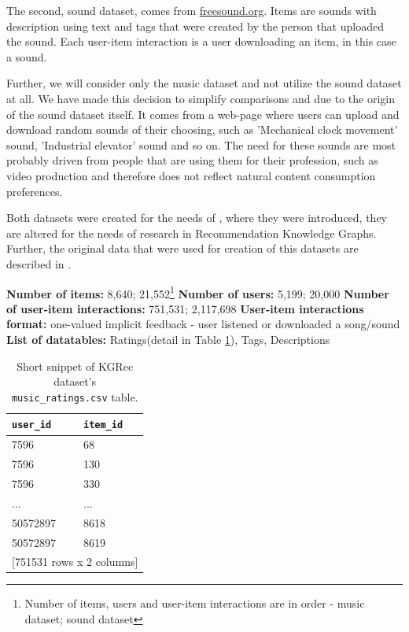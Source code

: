 The second, sound dataset, comes from \href{https://freesound.org/}{freesound.org}. Items are sounds with description using text and tags that were created by the person that uploaded the sound. Each user-item interaction is a user downloading an item, in this case a sound.

Further, we will consider only the music dataset and not utilize the sound dataset at all. We have made this decision to simplify comparisons and due to the origin of the sound dataset itself. It comes from a web-page where users can upload and download random sounds of their choosing, such as 'Mechanical clock movement' sound, 'Industrial elevator' sound and so on. The need for these sounds are most probably driven from people that are using them for their profession, such as video production and therefore does not reflect natural content consumption preferences.

Both datasets were created for the needs of \cite{kgrec_dataset_origin}, where they were introduced, they are altered for the needs of research in Recommendation Knowledge Graphs. Further, the original data that were used for creation of this datasets are described in \cite{kgrec_dataset_origin_full}.


\hfill \break
\noindent
\textbf{Number of items:} 8,640; 21,552\footnote{Number of items, users and user-item interactions are in order - music dataset; sound dataset} \newline
\textbf{Number of users:} 5,199; 20,000 \newline
\textbf{Number of user-item interactions:} 751,531; 2,117,698 \newline
\textbf{User-item interactions format:} one-valued implicit feedback - user listened or downloaded a song/sound \newline
\textbf{List of datatables:} Ratings(detail in Table \ref{table:5.1_KGRec_ratings}), Tags, Descriptions

\begin{table}[!ht]
    \centering
    \begin{tabular}{ l l }
        \verb|user_id|   & \verb|item_id| \\
        \hline
        7596     &  68  \\
        7596     & 130  \\
        7596     & 330  \\
        ...      & ...  \\
        50572897 & 8618 \\
        50572897 & 8619 \\ [1mm]
        \multicolumn{2}{l}{{[751531 rows x 2 columns]}}
    \end{tabular}
    \caption{Short snippet of KGRec dataset's \texttt{music\_ratings.csv} table.}
    \label{table:5.1_KGRec_ratings}
\end{table}

